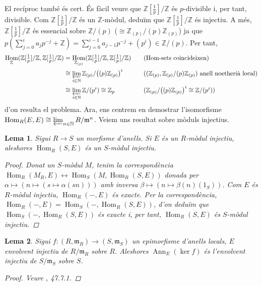 \documentclass[compress]{article}
\newtheorem{lema}{Lema}
\theoremstyle{definition}
\DeclareMathOperator{\Hom}{Hom}
\DeclareMathOperator{\Ann}{Ann}
\begin{document}
El recíproc també és cert. És fàcil veure que $\mathbb{Z}[\frac{1}{p}]/\mathbb{Z}$ és $p$-divisible i, per tant, divisible. Com $\mathbb{Z}[\frac{1}{p}]/\mathbb{Z}$ és un $\mathbb{Z}$-mòdul, deduïm que $\mathbb{Z}[\frac{1}{p}]/\mathbb{Z}$ és injectiu. A més, $\mathbb{Z}[\frac{1}{p}]/\mathbb{Z}$ és essencial sobre $\mathbb{Z}/(p)$ ($\cong\mathbb{Z}_{(p)}/(p)\mathbb{Z}_{(p)}$) ja que $p(\sum_{j=0}^{i}a_{j}p^{-j}+\mathbb{Z})=\sum_{j=0}^{i-1}a_{j-1}p^{-j}+(p^{i})\in\mathbb{Z}/(p)$. Per tant,
        \begin{align*}
            \Hom_{\mathbb{Z}}(\mathbb{Z}[\tfrac{1}{p}]/\mathbb{Z},\mathbb{Z}[\tfrac{1}{p}]/\mathbb{Z})
            &=\Hom_{\mathbb{Z}_{(p)}}(\mathbb{Z}[\tfrac{1}{p}]/\mathbb{Z},\mathbb{Z}[\tfrac{1}{p}]/\mathbb{Z})
            &\quad&\textrm{(Hom-sets coincideixen)}\\
            &\cong\varprojlim_{i\in\mathbb{N}}\mathbb{Z}_{(p)}/\big((p)\mathbb{Z}_{(p)}\big)^{i}
            &\quad&\textrm{($(\mathbb{Z}_{(p)},\mathbb{Z}_{(p)}/(p)\mathbb{Z}_{(p)})$ anell noetherià local)}\\
            &\cong\varprojlim_{i\in\mathbb{N}}\mathbb{Z}/(p^{i})
            \cong\mathbb{Z}_{p}
            &\quad&\textrm{($\mathbb{Z}_{(p)}/\big((p)\mathbb{Z}_{(p)}\big)^{i}\cong\mathbb{Z}/(p^{i})$)}
        \end{align*}
        d'on resulta el problema. Ara, ens centrem en demostrar l'isomorfisme $\Hom_{R}(E,E)\cong\varprojlim_{n\in\mathbb{N}} R/\mathfrak{m}^{n}$. Veiem uns resultat sobre mòduls injectius.
        \begin{lema}
            Sigui $R\rightarrow S$ un morfisme d'anells. Si $E$ és un $R$-mòdul injectiu, aleshores $\Hom_{R}(S,E)$ és un $S$-mòdul injectiu.
            \begin{proof}
                Donat un $S$-mòdul $M$, tenim la correspondència $\Hom_{R}(M_{R},E)\leftrightarrow\Hom_{S}(M,\Hom_{R}(S,E))$ donada per $\alpha\mapsto(n\mapsto(s\mapsto\alpha(sn)))$ amb inversa $\beta\mapsto(n\mapsto\beta(n)(1_{S}))$. Com $E$ és $R$-mòdul injectiu, $\Hom_{R}(-,E)$ és exacte. Per la correspondència, $\Hom_{R}(-,E)=\Hom_{S}(-,\Hom_{R}(S,E))$, d'on deduïm que $\Hom_{S}(-,\Hom_{R}(S,E))$ és exacte i, per tant, $\Hom_{R}(S,E)$ és $S$-mòdul injectiu.
            \end{proof}
        \end{lema}
        \begin{lema}
            Sigui $f:(R,\mathfrak{m}_{R})\rightarrow(S,\mathfrak{m}_{S})$ un epimorfisme d'anells locals, $E$ envolvent injectiu de $R/\mathfrak{m}_{R}$ sobre $R$. Aleshores $\Ann_{E}(\ker{f})$ és l'envolvent injectiu de $S/\mathfrak{m}_{S}$ sobre $S$.
            \begin{proof}
                Veure \cite{SP2024}, 47.7.1.
            \end{proof}
        \end{lema}
\end{document}
